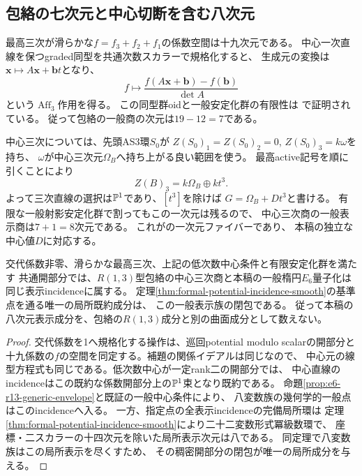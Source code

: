 \subsection{包絡の七次元と中心切断を含む八次元}
最高三次が滑らかな$f=f_3+f_2+f_1$の係数空間は十九次元である。
中心一次直線を保つgraded同型を共通次数スカラーで規格化すると、
生成元の変換は$\mathbf x\mapsto A\mathbf x+\mathbf b t$となり、
\[
 f\longmapsto\frac{f(A\mathbf x+\mathbf b)-f(\mathbf b)}{\det A}
\]
という$\operatorname{Aff}_3$作用を得る。
この同型群oidと一般安定化群の有限性は
\cite[定理 \texttt{thm:r13-affine}]{CompanionAmbient}で証明されている。
従って包絡の一般商の次元は$19-12=7$である。

中心三次については、先頭AS3環$S_0$が
$Z(S_0)_1=Z(S_0)_2=0$, $Z(S_0)_3=k\omega$を持ち、
$\omega$が中心三次元$\Omega_B$へ持ち上がる良い範囲を使う。
最高active記号を順に引くことにより
\[
 Z(B)_3=k\Omega_B\oplus kt^3.
\]
よって三次直線の選択は$\mathbb P^1$であり、$[t^3]$を除けば
$G=\Omega_B+D t^3$と書ける。
有限な一般射影安定化群で割ってもこの一次元は残るので、
中心三次商の一般表示商は$7+1=8$次元である。
これが\cite[命題 \texttt{prop:center}]{CompanionAmbient}の一次元ファイバーであり、
本稿の独立な中心値$D$に対応する。

\begin{corollary}[同じ表示成分の一般部分と三捩れ特殊部分]
\label{cor:e6-r13-same-presentation}
交代係数非零、滑らかな最高三次、上記の低次数中心条件と有限安定化群を満たす
共通開部分では、$R(1,3)$型包絡の中心三次商と本稿の一般楕円$E_6$量子化は
同じ表示incidenceに属する。
定理\ref{thm:formal-potential-incidence-smooth}の基準点を通る唯一の局所既約成分は、
この一般表示族の閉包である。
従って本稿の八次元表示成分を、包絡の$R(1,3)$成分と別の曲面成分として数えない。
\end{corollary}
\begin{proof}
交代係数を1へ規格化する操作は、巡回potential modulo scalarの開部分と
十九係数の$f$の空間を同定する。補題の関係イデアルは同じなので、
中心元の線型方程式も同じである。低次数中心が一定rank二の開部分では、
中心直線のincidenceはこの既約な係数開部分上の$\mathbb P^1$束となり既約である。
命題\ref{prop:e6-r13-generic-envelope}と既証の一般中心条件により、
八変数族の幾何学的一般点はこのincidenceへ入る。
一方、指定点の全表示incidenceの完備局所環は
定理\ref{thm:formal-potential-incidence-smooth}により二十二変数形式冪級数環で、
座標・二スカラーの十四次元を除いた局所表示次元は八である。
同定理で八変数族はこの局所表示を尽くすため、
その稠密開部分の閉包が唯一の局所成分を与える。
\end{proof}

